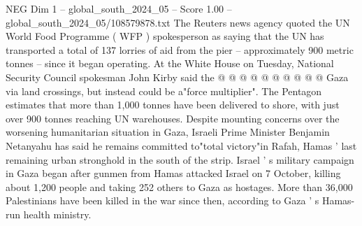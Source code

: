 \begin{textsample}{NEG Dim 1 – global\_south\_2024\_05 – Score 1.00 – global\_south\_2024\_05/108579878.txt}
The Reuters news agency quoted the UN World Food Programme ( WFP ) spokesperson as saying that the UN has transported a total of 137 lorries of aid from the pier -- approximately 900 metric tonnes -- since it began operating.
At the White House on Tuesday, National Security Council spokesman John Kirby said the @ @ @ @ @ @ @ @ @ @ Gaza via land crossings, but instead could be a"force multiplier".
The Pentagon estimates that more than 1,000 tonnes have been delivered to shore, with just over 900 tonnes reaching UN warehouses.
Despite mounting concerns over the worsening humanitarian situation in Gaza, Israeli Prime Minister Benjamin Netanyahu has said he remains committed to"total victory"in Rafah, Hamas ' last remaining urban stronghold in the south of the strip.
Israel ' s military campaign in Gaza began after gunmen from Hamas attacked Israel on 7 October, killing about 1,200 people and taking 252 others to Gaza as hostages.
More than 36,000 Palestinians have been killed in the war since then, according to Gaza ' s Hamas-run health ministry.

\end{textsample}
